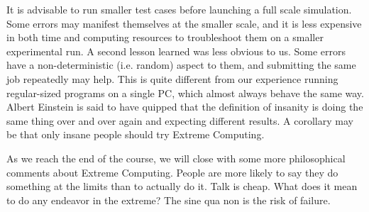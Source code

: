 \documentclass[11pt]{article} %
\begin{document}
			It is advisable to run smaller test cases before launching a full scale simulation.
			Some errors may manifest themselves at the smaller scale, 
			and it is less expensive in both time and computing resources to troubleshoot them
			on a smaller experimental run.
			A second lesson learned was less obvious to us.  
			Some errors have a non-deterministic (i.e. random) aspect to them,
			and submitting the same job repeatedly may help.
			This is quite different from our experience running regular-sized programs on a single
			PC, which almost always behave the same way.
			Albert Einstein is said to have quipped that the definition of insanity is doing the same thing 
			over and over again and expecting different results.
			A corollary may be that only insane people should try Extreme Computing.
			
			As we reach the end of the course, we will close with some more 
			philosophical comments about Extreme Computing.
			People are more likely to say they do something at the limits than to actually do it.
			Talk is cheap.  What does it mean to do any endeavor in the extreme?
			The sine qua non is the risk of failure.
			
\end{document}
